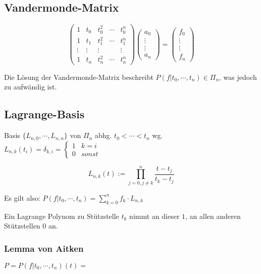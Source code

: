 \subsection*{Vandermonde-Matrix}

$$\begin{pmatrix}
1      & t_0    & t_0^2  & \cdots & t_0^n  \\
1      & t_1    & t_1^2  & \cdots & t_1^n  \\
\vdots & \vdots & \vdots &        & \vdots \\
1      & t_n    & t_n^2  & \cdots & t_n^n
\end{pmatrix}
\begin{pmatrix}a_0 \\ \vdots \\ \vdots \\ a_n\end{pmatrix} =
\begin{pmatrix}f_0 \\ \vdots \\ \vdots \\ f_n\end{pmatrix}$$

Die Lösung der Vandermonde-Matrix beschreibt $P(f|t_0,\cdots,t_n) \in \Pi_n$, was jedoch zu aufwändig ist.

\subsection*{Lagrange-Basis}

Basis $\{L_{n,0},\cdots,L_{n,n}\}$ von $\Pi_n$ abhg. $t_0 < \cdots < t_n$ wg. $L_{n,k}(t_i) = \delta_{k,i} = \begin{cases}1 & k=i \\ 0 & sonst\end{cases}$

$$L_{n,k}(t) := \prod_{j=0,j\neq k}^n \frac{t-t_j}{t_k-t_j}$$

Es gilt also: $P(f|t_0,\cdots,t_n)=\sum_{k=0}^n f_k \cdot L_{n,k}$

\spacing

Ein Lagrange Polynom zu Stützstelle $t_k$ nimmt an dieser $1$, an allen anderen Stützstellen $0$ an.

\subsubsection*{Lemma von Aitken}

$P = P(f|t_0,\cdots,t_n)(t) =$

